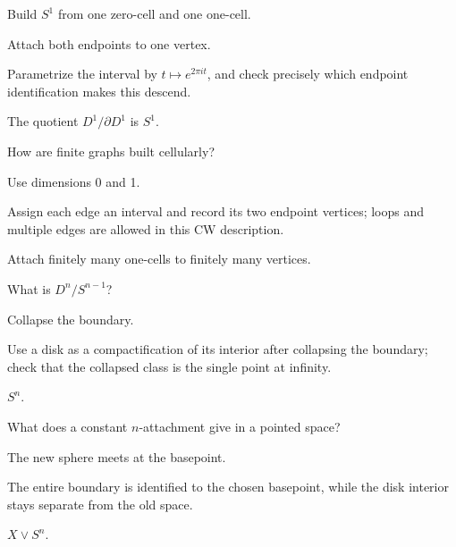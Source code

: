 \begin{exercise}\label{exr:viii05-08}
Build \(S^1\) from one zero-cell and one one-cell.
\end{exercise}
\begin{hint}
Attach both endpoints to one vertex.

Parametrize the interval by \(t\mapsto e^{2\pi it}\), and check precisely which endpoint identification makes this descend.
\end{hint}
\begin{solution}
The quotient \(D^1/\partial D^1\) is \(S^1\).
\end{solution}

\begin{exercise}\label{exr:viii05-09}
How are finite graphs built cellularly?
\end{exercise}
\begin{hint}
Use dimensions 0 and 1.

Assign each edge an interval and record its two endpoint vertices; loops and multiple edges are allowed in this CW description.
\end{hint}
\begin{solution}
Attach finitely many one-cells to finitely many vertices.
\end{solution}

\begin{exercise}\label{exr:viii05-10}
What is \(D^n/S^{n-1}\)?
\end{exercise}
\begin{hint}
Collapse the boundary.

Use a disk as a compactification of its interior after collapsing the boundary; check that the collapsed class is the single point at infinity.
\end{hint}
\begin{solution}
\(S^n\).
\end{solution}

\begin{exercise}\label{exr:viii05-11}
What does a constant \(n\)-attachment give in a pointed space?
\end{exercise}
\begin{hint}
The new sphere meets at the basepoint.

The entire boundary is identified to the chosen basepoint, while the disk interior stays separate from the old space.
\end{hint}
\begin{solution}
\(X\vee S^n\).
\end{solution}

